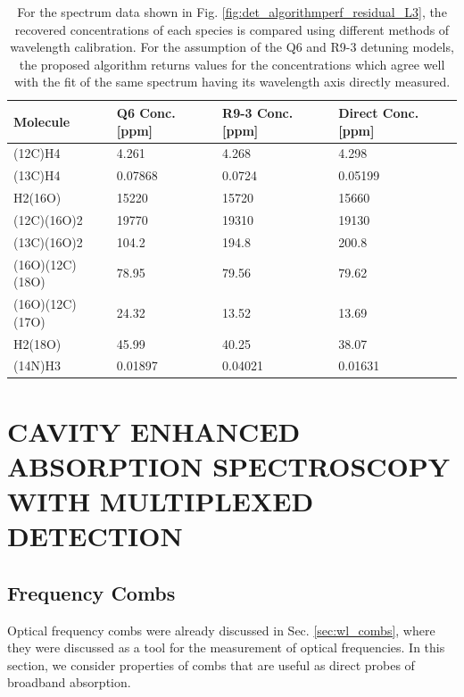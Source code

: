 \documentclass[8pt,a4paper]{report}
\begin{document}
	\begin{table}[H] 
		\begin{center}
			\caption{For the spectrum data shown in Fig. \ref{fig:det_algorithmperf_residual_L3}, the recovered concentrations of each species is compared using different methods of wavelength calibration. For the assumption of the Q6 and R9-3 detuning models, the proposed algorithm returns values for the concentrations which agree well with the fit of the same spectrum having its wavelength axis directly measured.}\label{table:det_conc_table}
			\setlength{\extrarowheight}{3pt} %
			\begin{NiceTabular}{|l|l|l|l|}
				\hline
				 Molecule & Q6 Conc. [ppm] & R9-3 Conc. [ppm] & Direct Conc. [ppm] \\
				\hline
				(12C)H4 & 4.261 & 4.268 & 4.298 \\
				\hline
				(13C)H4 & 0.07868 & 0.0724 & 0.05199 \\
				\hline
				H2(16O) & 15220 & 15720 & 15660 \\
				\hline
				(12C)(16O)2 & 19770 & 19310 & 19130 \\
				\hline
				(13C)(16O)2 & 104.2 & 194.8 & 200.8 \\
				\hline
				(16O)(12C)(18O) & 78.95 & 79.56 & 79.62 \\
				\hline
				(16O)(12C)(17O) & 24.32 & 13.52 & 13.69 \\
				\hline
				H2(18O) & 45.99 & 40.25 & 38.07 \\
				\hline
				(14N)H3 & 0.01897 & 0.04021 & 0.01631 \\
				\hline
			\end{NiceTabular}
		\end{center}
	\end{table}
	
	
	
	\chapter{CAVITY ENHANCED ABSORPTION SPECTROSCOPY WITH MULTIPLEXED DETECTION} \label{chap:comb_ceas}
	
	\section{Frequency Combs}
	Optical frequency combs were already discussed in Sec. \ref{sec:wl_combs}, where they were discussed as a tool for the measurement of optical frequencies. In this section, we consider properties of combs that are useful as direct probes of broadband absorption.
	
\end{document}
